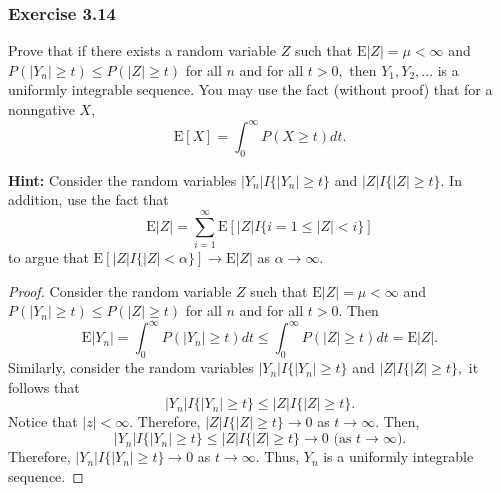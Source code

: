 \documentclass[12pt,]{article}
\begin{document}
\hypertarget{exercise-3.14}{%
\subsubsection{Exercise 3.14}\label{exercise-3.14}}

Prove that if there exists a random variable \(Z\) such that
\(\text{E}|Z|= \mu < \infty\) and \(P(|Y_n| \ge t) \le P(|Z|\ge t)\) for
all \(n\) and for all \(t>0,\) then \(Y_1, Y_2, ...\) is a uniformly
integrable sequence. You may use the fact (without proof) that for a
nonngative \(X\), \[\text{E}[X]=\int_0^\infty P(X\ge t)dt.\]

\textbf{Hint:} Consider the random variables \(|Y_n|I\{|Y_n|\ge t\}\)
and \(|Z|I\{|Z|\ge t\}.\) In addition, use the fact that
\[\text{E}|Z|=\sum_{i=1}^\infty \text{E}\left[|Z|I\{i=1\le |Z| < i\}\right]\]
to argue that \(\text{E}[|Z|I\{|Z|< \alpha\}]\rightarrow \text{E}|Z|\)
as \(\alpha \rightarrow \infty\).

\begin{proof}
Consider the random variable $Z$ such that $\text{E}|Z|= \mu < \infty$ and $P(|Y_n| \ge t) \le P(|Z|\ge t)$ for all $n$ and for all $t>0.$ Then
$$\text{E}|Y_n| = \int_0^\infty P(|Y_n|\ge t)dt \le \int_0^\infty P(|Z|\ge t)dt=\text{E}|Z|.$$ Similarly, consider the random variables $|Y_n|I\{|Y_n|\ge t\}$ and $|Z|I\{|Z|\ge t\},$ it follows that 
$$|Y_n|I\{|Y_n|\ge t\}\le|Z|I\{|Z|\ge t\}.$$
Notice that $|z| < \infty.$ Therefore, $|Z|I\{|Z|\ge t\} \rightarrow 0$ as $t\rightarrow \infty.$
Then,
$$|Y_n|I\{|Y_n|\ge t\}\le|Z|I\{|Z|\ge t\}\rightarrow 0 \text{ (as } t\rightarrow \infty).$$
Therefore, $|Y_n|I\{|Y_n|\ge t\}\rightarrow 0$ as $t\rightarrow \infty$. Thus, $Y_n$ is a uniformly integrable sequence. 
\end{proof}
\end{document}
